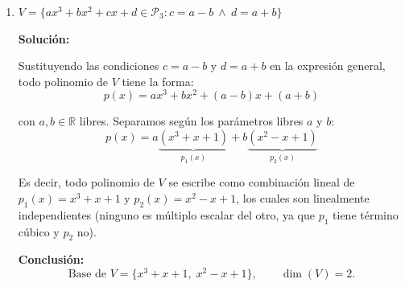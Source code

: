 \documentclass[12pt]{article}
\newcommand{\solucion}{%
    \vspace{0.8em}%
    \textbf{Solución:}%
    \vspace{0.8em}%
}
\begin{document}
\begin{enumerate}[label=\alph*.-]
    Es decir, todo elemento de $U$ se escribe como combinación lineal de:
    \[
    M_1=\begin{pmatrix}1&2&1\\0&0&0\end{pmatrix}, \qquad M_2=\begin{pmatrix}0&0&-1\\1&0&0\end{pmatrix}, \qquad M_3=\begin{pmatrix}0&0&0\\0&0&1\end{pmatrix}
    \]

    Verificamos que son linealmente independientes: si $\alpha M_1+\beta M_2+\gamma M_3=\begin{pmatrix}0&0&0\\0&0&0\end{pmatrix}$, de la entrada $(1,1)$ se obtiene $\alpha=0$; de la entrada $(2,1)$, $\beta=0$; y de la entrada $(2,3)$, $\gamma=0$.

    \textbf{Conclusión:}
    \[
    \text{Base de } U = \left\{ \begin{pmatrix}1&2&1\\0&0&0\end{pmatrix}, \begin{pmatrix}0&0&-1\\1&0&0\end{pmatrix}, \begin{pmatrix}0&0&0\\0&0&1\end{pmatrix} \right\}, \qquad \dim(U) = 3.
    \]

    \item $V = \{ax^3 + bx^2 + cx + d \in \mathcal{P}_3 : c = a - b \ \wedge\ d = a + b\}$

    \solucion

    Sustituyendo las condiciones $c=a-b$ y $d=a+b$ en la expresión general, todo polinomio de $V$ tiene la forma:
    \[
    p(x) = ax^3+bx^2+(a-b)x+(a+b)
    \]

    con $a,b\in\mathbb{R}$ libres. Separamos según los parámetros libres $a$ y $b$:
    \[
    p(x) = a\underbrace{(x^3+x+1)}_{p_1(x)} + b\underbrace{(x^2-x+1)}_{p_2(x)}
    \]

    Es decir, todo polinomio de $V$ se escribe como combinación lineal de $p_1(x)=x^3+x+1$ y $p_2(x)=x^2-x+1$, los cuales son linealmente independientes (ninguno es múltiplo escalar del otro, ya que $p_1$ tiene término cúbico y $p_2$ no).

    \textbf{Conclusión:}
    \[
    \text{Base de } V = \{x^3+x+1,\; x^2-x+1\}, \qquad \dim(V) = 2.
    \]
\end{enumerate}
\end{document}
